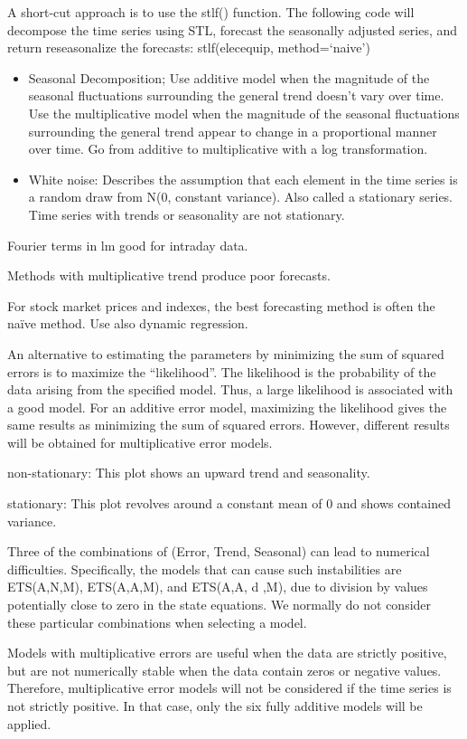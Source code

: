 \documentclass[]{book}
\begin{document}
A short-cut approach is to use the stlf() function. The following code will decompose the time series using STL, forecast the seasonally adjusted series, and return reseasonalize the forecasts: stlf(elecequip, method=`naive')

\begin{itemize}
\item
  Seasonal Decomposition; Use additive model when the magnitude of the seasonal fluctuations surrounding the general trend doesn't vary over time. Use the multiplicative model when the magnitude of the seasonal fluctuations surrounding the general trend appear to change in a proportional manner over time. Go from additive to multiplicative with a log transformation.
\item
  White noise: Describes the assumption that each element in the time series is a random draw from N(0, constant variance). Also called a stationary series. Time series with trends or seasonality are not stationary.
\end{itemize}

Fourier terms in lm good for intraday data.

Methods with multiplicative trend produce poor forecasts.

For stock market prices and indexes, the best forecasting method is often the naïve method. Use also dynamic regression.

An alternative to estimating the parameters by minimizing the sum of squared errors is to maximize the ``likelihood''. The likelihood is the probability of the data arising from the specified model. Thus, a large likelihood is associated with a good model. For an additive error model, maximizing the likelihood gives the same results as minimizing the sum of squared errors. However, different results will be obtained for multiplicative error models.

non-stationary: This plot shows an upward trend and seasonality.

stationary: This plot revolves around a constant mean of 0 and shows contained variance.

Three of the combinations of (Error, Trend, Seasonal) can lead to numerical difficulties. Specifically, the models that can cause such instabilities are ETS(A,N,M), ETS(A,A,M), and ETS(A,A, d ,M), due to division by values potentially close to zero in the state equations. We normally do not consider these particular combinations when selecting a model.

Models with multiplicative errors are useful when the data are strictly positive, but are not numerically stable when the data contain zeros or negative values. Therefore, multiplicative error models will not be considered if the time series is not strictly positive. In that case, only the six fully additive models will be applied.
\end{document}
